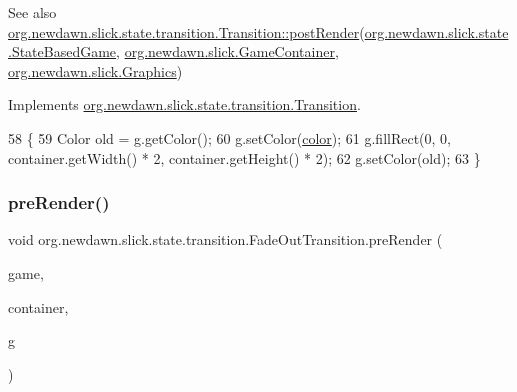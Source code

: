 \begin{DoxySeeAlso}{See also}
\mbox{\hyperlink{interfaceorg_1_1newdawn_1_1slick_1_1state_1_1transition_1_1_transition_ac113f4d5a19962a62a8adec7f9ab5d47}{org.\+newdawn.\+slick.\+state.\+transition.\+Transition\+::post\+Render}}(\mbox{\hyperlink{classorg_1_1newdawn_1_1slick_1_1state_1_1_state_based_game}{org.\+newdawn.\+slick.\+state.\+State\+Based\+Game}}, \mbox{\hyperlink{classorg_1_1newdawn_1_1slick_1_1_game_container}{org.\+newdawn.\+slick.\+Game\+Container}}, \mbox{\hyperlink{classorg_1_1newdawn_1_1slick_1_1_graphics}{org.\+newdawn.\+slick.\+Graphics}}) 
\end{DoxySeeAlso}


Implements \mbox{\hyperlink{interfaceorg_1_1newdawn_1_1slick_1_1state_1_1transition_1_1_transition_ac113f4d5a19962a62a8adec7f9ab5d47}{org.\+newdawn.\+slick.\+state.\+transition.\+Transition}}.


\begin{DoxyCode}
58                                                                                      \{
59         Color old = g.getColor();
60         g.setColor(\mbox{\hyperlink{classorg_1_1newdawn_1_1slick_1_1state_1_1transition_1_1_fade_out_transition_a71c42f67f13c8572900a197aef96aa90}{color}});
61         g.fillRect(0, 0, container.getWidth() * 2, container.getHeight() * 2);
62         g.setColor(old);
63     \}
\end{DoxyCode}
\mbox{\label{classorg_1_1newdawn_1_1slick_1_1state_1_1transition_1_1_fade_out_transition_af23dc84a0a07121f8f4ec307fdb578b2}} 
\subsubsection{\texorpdfstring{pre\+Render()}{preRender()}}
{\footnotesize\ttfamily void org.\+newdawn.\+slick.\+state.\+transition.\+Fade\+Out\+Transition.\+pre\+Render (\begin{DoxyParamCaption}\item[{\mbox{\hyperlink{classorg_1_1newdawn_1_1slick_1_1state_1_1_state_based_game}{State\+Based\+Game}}}]{game,  }\item[{\mbox{\hyperlink{classorg_1_1newdawn_1_1slick_1_1_game_container}{Game\+Container}}}]{container,  }\item[{\mbox{\hyperlink{classorg_1_1newdawn_1_1slick_1_1_graphics}{Graphics}}}]{g }\end{DoxyParamCaption})\hspace{0.3cm}{\ttfamily [inline]}}

